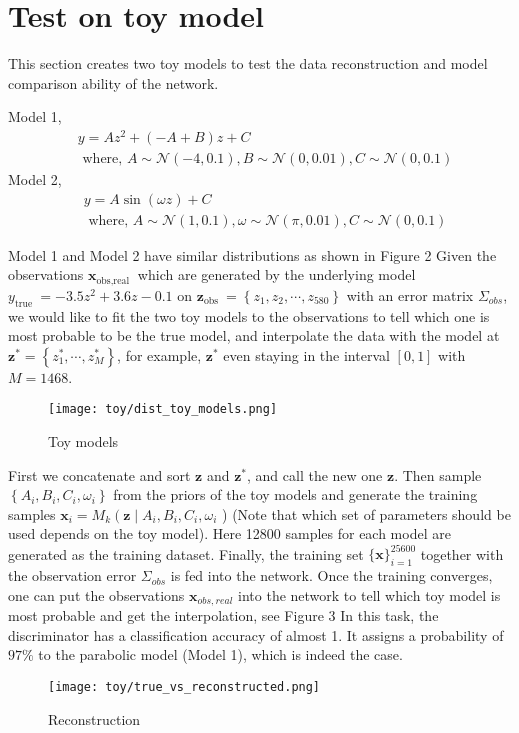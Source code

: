 \section{Test on toy model}
This section creates two toy models to test the data reconstruction and model comparison ability of the network.

Model 1,
$$
\begin{aligned}
&y=A z^{2}+(-A+B) z+C \\
&\text { where, } A \sim \mathcal{N}(-4,0.1), B \sim \mathcal{N}(0,0.01), C \sim \mathcal{N}(0,0.1)
\end{aligned}
$$
Model 2,
$$
\begin{aligned}
&y=A \sin (\omega z)+C \\
&\text { where, } A \sim \mathcal{N}(1,0.1), \omega \sim \mathcal{N}(\pi, 0.01), C \sim \mathcal{N}(0,0.1)
\end{aligned}
$$

Model 1 and Model 2 have similar distributions as shown in Figure 2 Given the observations $\boldsymbol{x}_{\text {obs,real }}$ which are generated by the underlying model $y_{\text {true }}=-3.5 z^{2}+3.6 z-0.1$ on $\boldsymbol{z}_{\text {obs }}=\left\{z_{1}, z_{2}, \cdots, z_{580}\right\}$ with an error matrix $\Sigma_{o b s}$, we would like to fit the two toy models to the observations to tell which one is most probable to be the true model, and interpolate the data with the model at $\boldsymbol{z}^{*}=\left\{z_{1}^{*}, \cdots, z_{M}^{*}\right\}$, for example, $\boldsymbol{z}^{*}$ even staying in the interval $[0,1]$ with $M=1468$.

\begin{figure}
	\centering
	\texttt{[image: toy/dist\_toy\_models.png]}
	\caption{Toy models}
	\label{fig:toy_model}
\end{figure}

First we concatenate and sort $\boldsymbol{z}$ and $\boldsymbol{z}^{*}$, and call the new one $\boldsymbol{z}$. Then sample $\left\{A_{i}, B_{i}, C_{i}, \omega_{i}\right\}$ from the priors of the toy models and generate the training samples $\boldsymbol{x}_{i}=M_{k}\left(\boldsymbol{z} \mid A_{i}, B_{i}, C_{i}, \omega_{i}\right.$ ) (Note that which set of parameters should be used depends on the toy model). Here 12800 samples for each model are generated as the training dataset. Finally, the training set $\{\boldsymbol{x}\}_{i=1}^{25600}$ together with the observation error $\Sigma_{o b s}$ is fed into the network. Once the training converges, one can put the observations $\boldsymbol{x}_{o b s, r e a l}$ into the network to tell which toy model is most probable and get the interpolation, see Figure 3 In this task, the discriminator has a classification accuracy of almost 1. It assigns a probability of $97 \%$ to the parabolic model (Model 1), which is indeed the case.

\begin{figure}
	\centering
	\texttt{[image: toy/true\_vs\_reconstructed.png]}
	\caption{Reconstruction}
	\label{fig:recon_toy}
\end{figure}